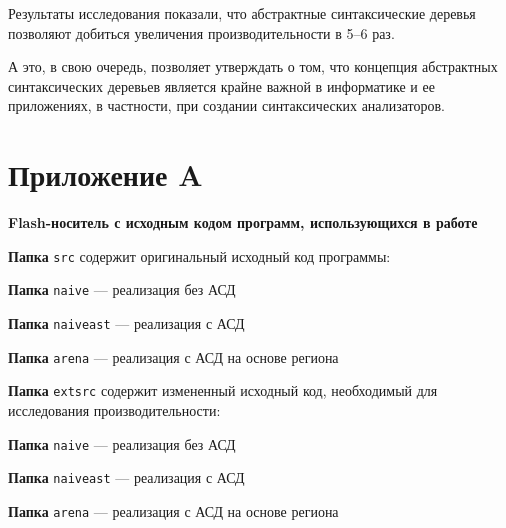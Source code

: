 \documentclass[coursework]{SCWorks}
\begin{document}
Результаты исследования показали, что абстрактные синтаксические деревья позволяют добиться увеличения производительности в 5–6 раз.

А это, в свою очередь, позволяет утверждать о том, что концепция абстрактных синтаксических деревьев является крайне важной в информатике и ее приложениях, в частности, при создании синтаксических анализаторов.

%

\nocite{*}





\appendix

\section{Приложение A}
\label{appendA}
\begin{center}
\textbf{Flash-носитель с исходным кодом программ, использующихся в работе}
\end{center}
\textbf{Папка} \texttt{src} содержит оригинальный исходный код программы:
\begin{description}
	\item \textbf{Папка} \texttt{naive} — реализация без АСД
	\item \textbf{Папка} \texttt{naiveast} — реализация с АСД
	\item \textbf{Папка} \texttt{arena} — реализация с АСД на основе региона
\end{description}
\textbf{Папка} \texttt{extsrc} содержит измененный исходный код, необходимый для исследования производительности:
\begin{description}
	\item \textbf{Папка} \texttt{naive} — реализация без АСД
	\item \textbf{Папка} \texttt{naiveast} — реализация с АСД
	\item \textbf{Папка} \texttt{arena} — реализация с АСД на основе региона
\end{description}
%
\end{document}
